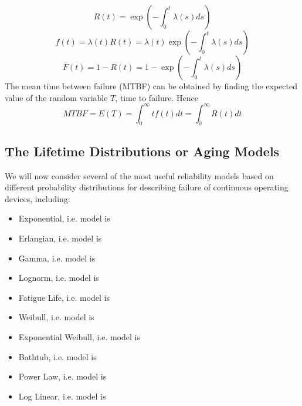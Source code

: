 \begin{equation}
  R(t) = \exp(-\int_{0}^{t} \lambda (s)ds)
\end{equation}
\begin{equation}
	f(t) = \lambda (t)R(t) = \lambda (t)\exp(-\int_{0}^{t} \lambda (s)ds)
\end{equation}
\begin{equation}
 	F(t) = 1 - R(t) = 1 - \exp(-\int_{0}^{t} \lambda (s)ds)
\end{equation}
The mean time between failure (MTBF) can be obtained by finding the expected value of the random variable
$T$, time to failure. Hence
\begin{equation}
  MTBF = E(T) = \int_{0}^{\infty} tf(t)dt = \int_{0}^{\infty} R(t)dt
\end{equation}

\subsection{The Lifetime Distributions or Aging Models}
We will now consider several of the most useful reliability models based on different probability
distributions for describing failure of continuous operating devices, including:
\begin{itemize}
	\item Exponential, i.e. model  is 
	\item Erlangian, i.e. model  is 
	\item Gamma, i.e. model  is 
	\item Lognorm, i.e. model  is 
	\item Fatigue Life, i.e. model  is 
	\item Weibull, i.e. model  is 
	\item Exponential Weibull, i.e. model  is 
	\item Bathtub, i.e. model  is 
	\item Power Law, i.e. model  is 
	\item Log Linear, i.e. model  is 
\end{itemize}


